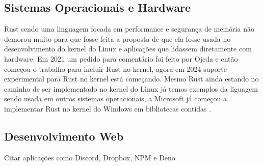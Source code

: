 \subsection{Sistemas Operacionais e Hardware}
Rust sendo uma linguagem focada em performance e seguran\c{c}a de mem\'{o}ria n\~{a}o demorou muito para que fosse feita a proposta de que ela fosse usada no desenvolvimento do kernel do Linux e aplica\c{c}\~{o}es que lidassem diretamente com hardware. Em 2021 um pedido para coment\'{a}rio foi feito por Ojeda e ent\~{a}o come\c{c}ou o trabalho para incluir Rust no kernel, agora em 2024 suporte experimental para Rust no kernel est\'{a} come\c{c}ando. Mesmo Rust ainda estando no caminho de ser implementado no kernel do Linux j\'{a} temos exemplos da liguagem sendo usada em outros sistemas operacionais, a Microsoft j\'{a} come\c{c}ou a implementar Rust no kernel do Windows em bibliotecas contidas \cite{Wes23}.
\par



\subsection{Desenvolvimento Web}
\par
Citar aplica\c{c}\~{o}es como Discord, Dropbox, NPM e Deno
